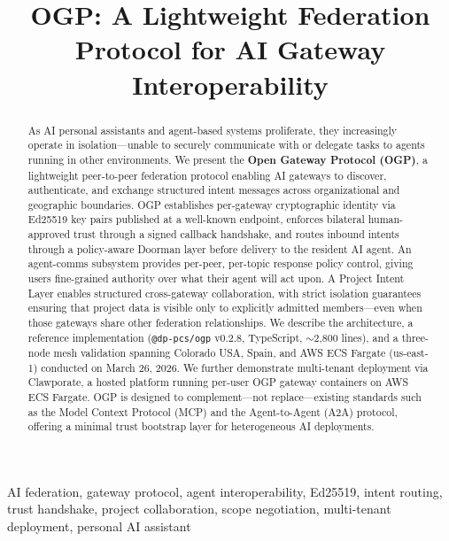 \documentclass[conference]{IEEEtran}
\begin{document}
\title{OGP: A Lightweight Federation Protocol for AI Gateway Interoperability}

\author{
}

\maketitle

\begin{abstract}
As AI personal assistants and agent-based systems proliferate, they increasingly operate in isolation---unable to securely communicate with or delegate tasks to agents running in other environments. We present the \textbf{Open Gateway Protocol (OGP)}, a lightweight peer-to-peer federation protocol enabling AI gateways to discover, authenticate, and exchange structured intent messages across organizational and geographic boundaries. OGP establishes per-gateway cryptographic identity via Ed25519 key pairs published at a well-known endpoint, enforces bilateral human-approved trust through a signed callback handshake, and routes inbound intents through a policy-aware Doorman layer before delivery to the resident AI agent. An agent-comms subsystem provides per-peer, per-topic response policy control, giving users fine-grained authority over what their agent will act upon. A Project Intent Layer enables structured cross-gateway collaboration, with strict isolation guarantees ensuring that project data is visible only to explicitly admitted members---even when those gateways share other federation relationships. We describe the architecture, a reference implementation (\texttt{@dp-pcs/ogp} v0.2.8, TypeScript, $\sim$2{,}800 lines), and a three-node mesh validation spanning Colorado USA, Spain, and AWS ECS Fargate (us-east-1) conducted on March 26, 2026. We further demonstrate multi-tenant deployment via Clawporate, a hosted platform running per-user OGP gateway containers on AWS ECS Fargate. OGP is designed to complement---not replace---existing standards such as the Model Context Protocol (MCP) and the Agent-to-Agent (A2A) protocol, offering a minimal trust bootstrap layer for heterogeneous AI deployments.
\end{abstract}

\begin{IEEEkeywords}
AI federation, gateway protocol, agent interoperability, Ed25519, intent routing, trust handshake, project collaboration, scope negotiation, multi-tenant deployment, personal AI assistant
\end{IEEEkeywords}
\end{document}

